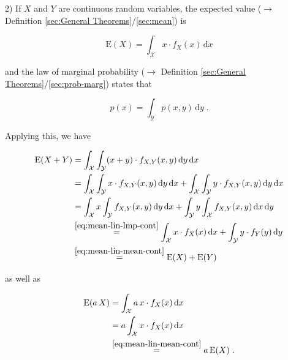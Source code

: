\documentclass[a4paper,12pt,twoside]{book}
\begin{document}
\vspace{1em}
2) If $X$ and $Y$ are continuous random variables, the expected value ($\rightarrow$ Definition \ref{sec:General Theorems}/\ref{sec:mean}) is

\begin{equation} \label{eq:mean-lin-mean-cont}
\mathrm{E}(X) = \int_{\mathcal{X}} x \cdot f_X(x) \, \mathrm{d}x
\end{equation}

and the law of marginal probability ($\rightarrow$ Definition \ref{sec:General Theorems}/\ref{sec:prob-marg}) states that

\begin{equation} \label{eq:mean-lin-lmp-cont}
p(x) = \int_{\mathcal{Y}} p(x,y) \, \mathrm{d}y \; .
\end{equation}

Applying this, we have

\begin{equation} \label{eq:mean-lin-mean-lin-s1-cont}
\begin{split}
\mathrm{E}(X + Y) &= \int_{\mathcal{X}} \int_{\mathcal{Y}} (x+y) \cdot f_{X,Y}(x,y) \, \mathrm{d}y \, \mathrm{d}x \\
&= \int_{\mathcal{X}} \int_{\mathcal{Y}} x \cdot f_{X,Y}(x,y) \, \mathrm{d}y \, \mathrm{d}x + \int_{\mathcal{X}} \int_{\mathcal{Y}} y \cdot f_{X,Y}(x,y) \, \mathrm{d}y \, \mathrm{d}x \\
&= \int_{\mathcal{X}} x \int_{\mathcal{Y}} f_{X,Y}(x,y) \, \mathrm{d}y \, \mathrm{d}x + \int_{\mathcal{Y}} y \int_{\mathcal{X}} f_{X,Y}(x,y) \, \mathrm{d}x \, \mathrm{d}y \\
&\overset{\eqref{eq:mean-lin-lmp-cont}}{=} \int_{\mathcal{X}} x \cdot f_X(x) \, \mathrm{d}x + \int_{\mathcal{Y}} y \cdot f_Y(y) \, \mathrm{d}y \\
&\overset{\eqref{eq:mean-lin-mean-cont}}{=} \mathrm{E}(X) + \mathrm{E}(Y)
\end{split}
\end{equation}

as well as

\begin{equation} \label{eq:mean-lin-mean-lin-s2-cont}
\begin{split}
\mathrm{E}(a\,X) &= \int_{\mathcal{X}} a \, x \cdot f_X(x) \, \mathrm{d}x \\
&= a \int_{\mathcal{X}} x \cdot f_X(x) \, \mathrm{d}x \\
&\overset{\eqref{eq:mean-lin-mean-cont}}{=} a \, \mathrm{E}(X) \; .
\end{split}
\end{equation}
\end{document}
